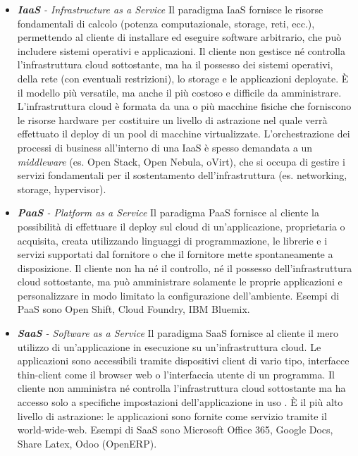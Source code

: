 \documentclass[../main.tex]{subfiles}
\begin{document}
\begin{itemize}
\item \textit{\textbf{IaaS} - Infrastructure as a Service} Il paradigma IaaS fornisce le risorse fondamentali di calcolo (potenza computazionale, storage, reti, ecc.), permettendo al cliente di installare ed eseguire software arbitrario, che può includere sistemi operativi e applicazioni. Il cliente non gestisce né controlla l'infrastruttura cloud sottostante, ma ha il possesso dei sistemi operativi, della rete (con eventuali restrizioni), lo storage e le applicazioni deployate.
\`E il modello più versatile, ma anche il più costoso e difficile da amministrare.
L'infrastruttura cloud è formata da una o più macchine fisiche che forniscono le risorse hardware per costituire un livello di astrazione nel quale verrà effettuato il deploy di un pool di macchine virtualizzate.
L'orchestrazione dei processi di business all'interno di una IaaS è spesso demandata a un \textit{middleware} (es. Open Stack, Open Nebula, oVirt), che si occupa di gestire i servizi fondamentali per il sostentamento dell'infrastruttura (es. networking, storage, hypervisor).
\item \textit{\textbf{PaaS} - Platform as a Service} Il paradigma PaaS fornisce al cliente la possibilità di effettuare il deploy sul cloud di un'applicazione, proprietaria o acquisita, creata utilizzando linguaggi di programmazione, le librerie e i servizi supportati dal fornitore o che il fornitore mette spontaneamente a disposizione. Il cliente non ha né il controllo, né il possesso dell'infrastruttura cloud sottostante, ma può amministrare solamente le proprie applicazioni e personalizzare in modo limitato la configurazione dell'ambiente.
Esempi di PaaS sono Open Shift, Cloud Foundry, IBM Bluemix.
\item \textit{\textbf{SaaS} - Software as a Service} Il paradigma SaaS fornisce al cliente il mero utilizzo di un'applicazione in esecuzione su un'infrastruttura cloud. Le applicazioni sono accessibili tramite dispositivi client di vario tipo, interfacce thin-client come il browser web o l'interfaccia utente di un programma.
Il cliente non amministra né controlla l'infrastruttura cloud sottostante ma ha accesso solo a specifiche impostazioni dell'applicazione in uso \cite{NISTCloud}.
\`E il più alto livello di astrazione: le applicazioni sono fornite come servizio tramite il world-wide-web. 
Esempi di SaaS sono Microsoft Office 365, Google Docs, Share Latex, Odoo (OpenERP).
\end{itemize}
\end{document}

